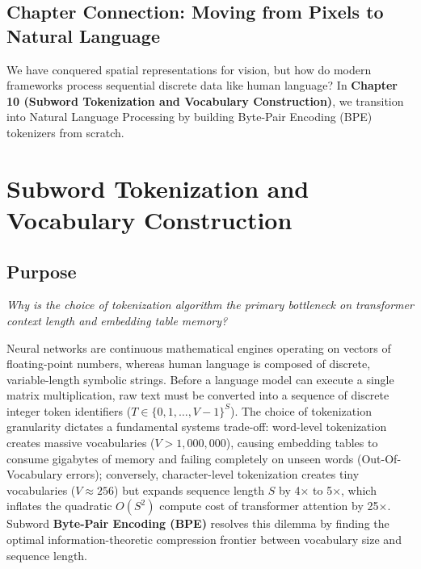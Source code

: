 \documentclass[
  letterpaper,
]{scrbook}
\begin{document}
\section{Chapter Connection: Moving from Pixels to Natural
Language}\label{chapter-connection-moving-from-pixels-to-natural-language}

We have conquered spatial representations for vision, but how do modern
frameworks process sequential discrete data like human language? In
\textbf{Chapter 10 (Subword Tokenization and Vocabulary Construction)},
we transition into Natural Language Processing by building Byte-Pair
Encoding (BPE) tokenizers from scratch.

\chapter{Subword Tokenization and Vocabulary
Construction}\label{subword-tokenization-and-vocabulary-construction}

\section*{Purpose}\label{purpose-11}


\emph{Why is the choice of tokenization algorithm the primary bottleneck
on transformer context length and embedding table memory?}

Neural networks are continuous mathematical engines operating on vectors
of floating-point numbers, whereas human language is composed of
discrete, variable-length symbolic strings. Before a language model can
execute a single matrix multiplication, raw text must be converted into
a sequence of discrete integer token identifiers
(\(T \in \{0, 1, \dots, V-1\}^S\)). The choice of tokenization
granularity dictates a fundamental systems trade-off: word-level
tokenization creates massive vocabularies (\(V > 1,000,000\)), causing
embedding tables to consume gigabytes of memory and failing completely
on unseen words (Out-Of-Vocabulary errors); conversely, character-level
tokenization creates tiny vocabularies (\(V \approx 256\)) but expands
sequence length \(S\) by 4× to 5×, which inflates the quadratic
\(O(S^2)\) compute cost of transformer attention by 25×. Subword
\textbf{Byte-Pair Encoding (BPE)} resolves this dilemma by finding the
optimal information-theoretic compression frontier between vocabulary
size and sequence length.
\end{document}
